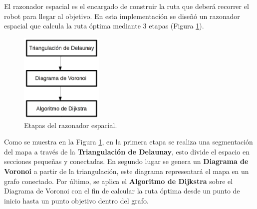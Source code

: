 \documentclass[11pt,twoside,A5]{article}
\newcommand{\reffigure}[1]{Figura \ref{#1}}
\newcommand{\refpfigure}[1]{(\reffigure{#1})}
\begin{document}
El razonador espacial es el encargado de construir la ruta que deberá recorrer el robot para llegar al objetivo.
En esta implementación se diseñó un razonador espacial que calcula la ruta óptima mediante 3 etapas \refpfigure{fig:razonador-espacial}.

\begin{figure}[H]
\begin{center}
\includegraphics[width=4cm]{razonador-espacial.png} 
\caption{Etapas del razonador espacial.}
\label{fig:razonador-espacial}
\end{center}
\end{figure}

Como se muestra en la \reffigure{fig:razonador-espacial}, en la primera etapa se realiza una segmentación del mapa
a través de la \textbf{Triangulación de Delaunay}, esto divide el espacio en secciones pequeñas y conectadas. En segundo lugar
se genera un \textbf{Diagrama de Voronoi} a partir de la triangulación, este diagrama representará el mapa
en un grafo conectado. Por último, se aplica el \textbf{Algoritmo de Dijkstra} sobre el Diagrama de Voronoi con el fin
de calcular la ruta óptima desde un punto de inicio hasta un punto objetivo dentro del grafo.
\end{document}
